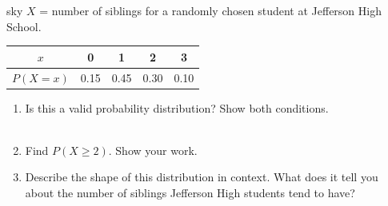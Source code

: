 \documentclass[10pt]{article}
\begin{document}
\namedateperiod

\vspace{0.14in}

\begin{scenariobox}[Context]{sky}
\small
$X$ = number of siblings for a randomly chosen student at Jefferson High School.
\begin{center}
\renewcommand{\arraystretch}{1.3}
\begin{tabular}{@{}ccccc@{}}
$x$ & 0 & 1 & 2 & 3 \\
\hline
$P(X=x)$ & 0.15 & 0.45 & 0.30 & 0.10 \\
\end{tabular}
\end{center}
\end{scenariobox}

\vspace{0.1in}

\begin{practicebox}
\small
\begin{enumerate}[leftmargin=1.5em, itemsep=12pt]
  \item Is this a valid probability distribution? Show both conditions.\\
        \writeline\\[1pt]\writeline

  \item Find $P(X \ge 2)$. Show your work.

        \vspace{0.3in}

  \item Describe the shape of this distribution in context. What does it tell you about
        the number of siblings Jefferson High students tend to have?\\
        \writeline\\[1pt]\writeline\\[1pt]\writeline
\end{enumerate}
\end{practicebox}
\end{document}
